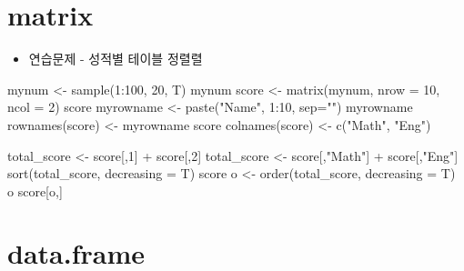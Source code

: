 \documentclass[
]{book}
\newenvironment{Shaded}{\begin{snugshade}}{\end{snugshade}}
\newcommand{\AttributeTok}[1]{\textcolor[rgb]{0.77,0.63,0.00}{#1}}
\newcommand{\DecValTok}[1]{\textcolor[rgb]{0.00,0.00,0.81}{#1}}
\newcommand{\FunctionTok}[1]{\textcolor[rgb]{0.00,0.00,0.00}{#1}}
\newcommand{\NormalTok}[1]{#1}
\newcommand{\OtherTok}[1]{\textcolor[rgb]{0.56,0.35,0.01}{#1}}
\newcommand{\SpecialCharTok}[1]{\textcolor[rgb]{0.00,0.00,0.00}{#1}}
\newcommand{\StringTok}[1]{\textcolor[rgb]{0.31,0.60,0.02}{#1}}
\providecommand{\tightlist}{%
  \setlength{\itemsep}{0pt}\setlength{\parskip}{0pt}}
\begin{document}
\hypertarget{matrix-1}{%
\section{matrix}\label{matrix-1}}

\begin{itemize}
\tightlist
\item
  연습문제 - 성적별 테이블 정렬렬
\end{itemize}

\begin{Shaded}
\begin{Highlighting}[]
\NormalTok{mynum }\OtherTok{\textless{}{-}} \FunctionTok{sample}\NormalTok{(}\DecValTok{1}\SpecialCharTok{:}\DecValTok{100}\NormalTok{, }\DecValTok{20}\NormalTok{, T)}
\NormalTok{mynum}
\NormalTok{score }\OtherTok{\textless{}{-}} \FunctionTok{matrix}\NormalTok{(mynum, }\AttributeTok{nrow =} \DecValTok{10}\NormalTok{, }\AttributeTok{ncol =} \DecValTok{2}\NormalTok{)}
\NormalTok{score}
\NormalTok{myrowname }\OtherTok{\textless{}{-}} \FunctionTok{paste}\NormalTok{(}\StringTok{"Name"}\NormalTok{, }\DecValTok{1}\SpecialCharTok{:}\DecValTok{10}\NormalTok{, }\AttributeTok{sep=}\StringTok{""}\NormalTok{)}
\NormalTok{myrowname}
\FunctionTok{rownames}\NormalTok{(score) }\OtherTok{\textless{}{-}}\NormalTok{ myrowname}
\NormalTok{score}
\FunctionTok{colnames}\NormalTok{(score) }\OtherTok{\textless{}{-}} \FunctionTok{c}\NormalTok{(}\StringTok{"Math"}\NormalTok{, }\StringTok{"Eng"}\NormalTok{)}

\NormalTok{total\_score }\OtherTok{\textless{}{-}}\NormalTok{ score[,}\DecValTok{1}\NormalTok{] }\SpecialCharTok{+}\NormalTok{ score[,}\DecValTok{2}\NormalTok{]}
\NormalTok{total\_score }\OtherTok{\textless{}{-}}\NormalTok{ score[,}\StringTok{"Math"}\NormalTok{] }\SpecialCharTok{+}\NormalTok{ score[,}\StringTok{"Eng"}\NormalTok{]}
\FunctionTok{sort}\NormalTok{(total\_score, }\AttributeTok{decreasing =}\NormalTok{ T)}
\NormalTok{score}
\NormalTok{o }\OtherTok{\textless{}{-}} \FunctionTok{order}\NormalTok{(total\_score, }\AttributeTok{decreasing =}\NormalTok{ T)}
\NormalTok{o}
\NormalTok{score[o,]}
\end{Highlighting}
\end{Shaded}

\hypertarget{data.frame-1}{%
\section{data.frame}\label{data.frame-1}}
\end{document}
